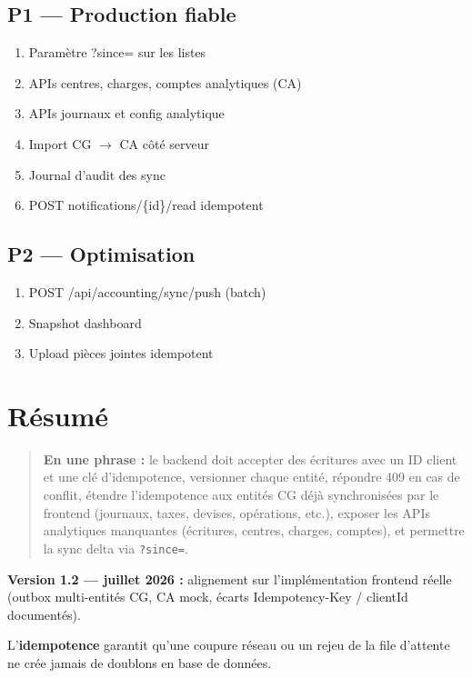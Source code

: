 \documentclass[12pt,a4paper]{report}
\begin{document}
\section{P1 --- Production fiable}

\begin{enumerate}
  \item Paramètre ?since= sur les listes
  \item APIs centres, charges, comptes analytiques (CA)
  \item APIs journaux et config analytique
  \item Import CG $\rightarrow$ CA côté serveur
  \item Journal d'audit des sync
  \item POST notifications/\{id\}/read idempotent
\end{enumerate}

\section{P2 --- Optimisation}

\begin{enumerate}
  \item POST /api/accounting/sync/push (batch)
  \item Snapshot dashboard
  \item Upload pièces jointes idempotent
\end{enumerate}

\chapter{Résumé}

\begin{quote}
\textbf{En une phrase :} le backend doit accepter des écritures avec un ID client et une clé d'idempotence, versionner chaque entité, répondre 409 en cas de conflit, étendre l'idempotence aux entités CG déjà synchronisées par le frontend (journaux, taxes, devises, opérations, etc.), exposer les APIs analytiques manquantes (écritures, centres, charges, comptes), et permettre la sync delta via \texttt{?since=}.
\end{quote}

\textbf{Version 1.2 --- juillet 2026 :} alignement sur l'implémentation frontend réelle (outbox multi-entités CG, CA mock, écarts Idempotency-Key / clientId documentés).

L'\textbf{idempotence} garantit qu'une coupure réseau ou un rejeu de la file d'attente ne crée jamais de doublons en base de données.
\end{document}
